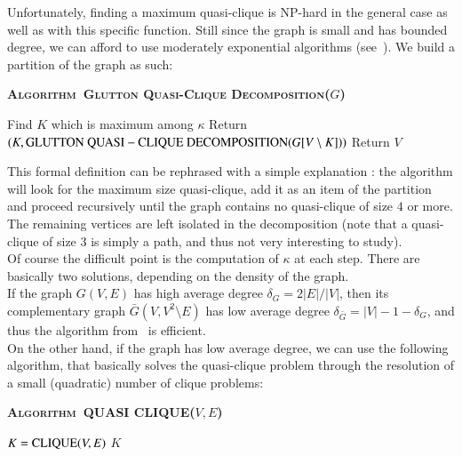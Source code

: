 \documentclass[preprint]{elsarticle}
\newcommand{\algo}[1]{\textsc{Algorithm~#1}}
\begin{document}
Unfortunately, finding a maximum quasi-clique is NP-hard in the general case as well as with this specific function. Still since the graph is small and has bounded degree, we can afford to use moderately exponential algorithms (see~\cite{qis}). We build a partition of the graph as such:\\

\begin{algorithm}[ht!]
\textbf{\algo{Glutton Quasi-Clique Decomposition}($G$)}
\label{algo:glutton}
\begin{algorithmic}[1]
        \STATE Find $K$ which is maximum among $\kappa$
        \STATE Return $(K,{\rm GLUTTON~QUASI-CLIQUE~DECOMPOSITION}(G[V\setminus K]))$
    \ELSE
    	\STATE Return $V$
    \ENDIF
\end{algorithmic}
\end{algorithm}

This formal definition can be rephrased with a simple explanation : the algorithm will look for the maximum size quasi-clique, add it as an item of the partition and proceed recursively until the graph contains no quasi-clique of size $4$ or more. The remaining vertices are left isolated in the decomposition (note that a quasi-clique of size $3$ is simply a path, and thus not very interesting to study).\\

Of course the difficult point is the computation of $\kappa$ at each step. There are basically two solutions, depending on the density of the graph.\\

If the graph $G(V,E)$ has high average degree $\delta_G = 2|E|/|V|$, then its complementary graph $\bar{G}(V,V^2\setminus E)$ has low average degree $\delta_{\bar{G}} = |V|-1-\delta_G$, and thus the algorithm from~\cite{qis} is efficient.\\

On the other hand, if the graph has low average degree, we can use the following algorithm, that basically solves the quasi-clique problem through the resolution of a small (quadratic) number of clique problems:

\begin{algorithm}[ht!]
\textbf{\algo{QUASI CLIQUE}($V,E$)}
\label{algo:param}
\begin{algorithmic}[1]
	\STATE $K = {\rm CLIQUE}(V,E)$
	\ENDFOR
	\RETURN $K$
\end{algorithmic}
\end{algorithm}
\end{document}
